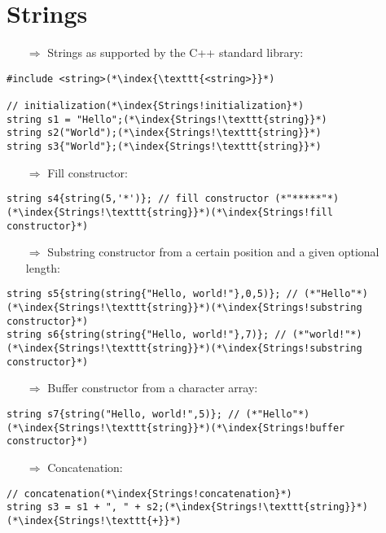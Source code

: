 \documentclass[10pt]{article}
\begin{document}
\section{Strings}
\small
\begin{enumerate}
\item[$\Rightarrow$] Strings as supported by the C++ standard library:
\end{enumerate}
\begin{lstlisting}
#include <string>(*\index{\texttt{<string>}}*)

// initialization(*\index{Strings!initialization}*)
string s1 = "Hello";(*\index{Strings!\texttt{string}}*)
string s2("World");(*\index{Strings!\texttt{string}}*)
string s3{"World"};(*\index{Strings!\texttt{string}}*)
\end{lstlisting}
\begin{enumerate}
\item[$\Rightarrow$] Fill constructor:
\end{enumerate}
\begin{lstlisting}
string s4{string(5,'*')}; // fill constructor (*"*****"*)(*\index{Strings!\texttt{string}}*)(*\index{Strings!fill constructor}*)
\end{lstlisting}
\begin{enumerate}
\item[$\Rightarrow$] Substring constructor from a certain position and a given optional length:
\end{enumerate}
\begin{lstlisting}
string s5{string(string{"Hello, world!"},0,5)}; // (*"Hello"*)(*\index{Strings!\texttt{string}}*)(*\index{Strings!substring constructor}*)
string s6{string(string{"Hello, world!"},7)}; // (*"world!"*)(*\index{Strings!\texttt{string}}*)(*\index{Strings!substring constructor}*)
\end{lstlisting}
\begin{enumerate}
\item[$\Rightarrow$] Buffer constructor from a character array:
\end{enumerate}
\begin{lstlisting}
string s7{string("Hello, world!",5)}; // (*"Hello"*)(*\index{Strings!\texttt{string}}*)(*\index{Strings!buffer constructor}*)
\end{lstlisting}
\begin{enumerate}
\item[$\Rightarrow$] Concatenation:
\end{enumerate}
\begin{lstlisting}
// concatenation(*\index{Strings!concatenation}*)
string s3 = s1 + ", " + s2;(*\index{Strings!\texttt{string}}*)(*\index{Strings!\texttt{+}}*)
\end{lstlisting}
\end{document}
